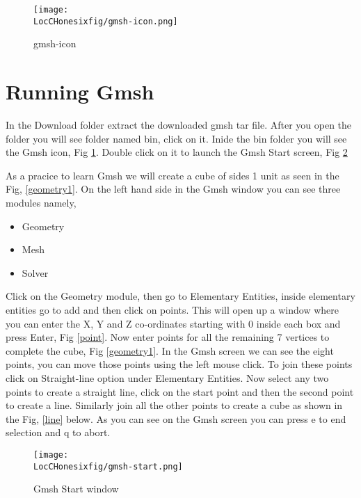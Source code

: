 \begin{figure}[ht]  
\begin{center}  
\texttt{[image: \\LocCHonesixfig/gmsh-icon.png]}
\caption{gmsh-icon}
\label{gmsh-icon}
\end{center}  
\end{figure}

\section{Running Gmsh}

\flushleft In the Download folder extract the downloaded gmsh tar file. After you open the folder you will see folder named bin, click on it. 
Inide the bin folder you will see the Gmsh icon, Fig \ref{gmsh-icon}. Double click on it to launch the Gmsh Start screen, Fig \ref{gmsh-start} \newline

As a pracice to learn Gmsh we will create a cube of sides 1 unit as seen in the Fig, \ref{geometry1}. On the left hand side in the Gmsh window you can 
see three modules namely,

\begin{itemize}
\item Geometry
\item Mesh
\item Solver
\end{itemize}

Click on the Geometry module, then go to Elementary Entities, inside elementary entities go to add and then click on points. This will open up a
window where you can enter the X, Y and Z co-ordinates starting with 0 inside each box and press Enter, Fig \ref{point}. Now
enter points for all the remaining 7 vertices to complete the cube, Fig \ref{geometry1}. In the Gmsh screen we can see the eight points, you can move those points
using the left mouse click. To join these points click on Straight-line option under Elementary Entities. Now select any two points to create a straight line, click 
on the start point and then the second point to create a line. Similarly join all the other points to create a cube as shown in the Fig, \ref{line} below.
As you can see on the Gmsh screen you can press e to end selection and q to abort.

\begin{figure}[t]  
\begin{center}  
\texttt{[image: \\LocCHonesixfig/gmsh-start.png]}
\caption{Gmsh Start window}
\label{gmsh-start}
\end{center}  
\end{figure}

